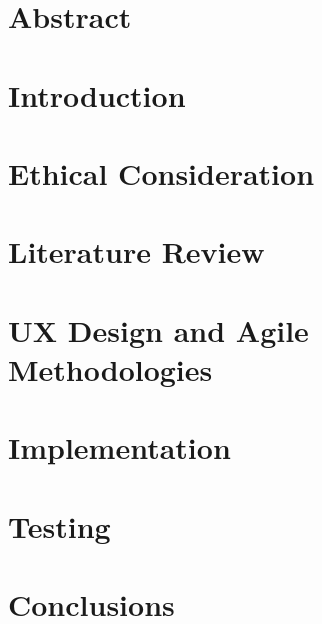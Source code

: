 \documentclass[oneside,openright,titlepage,numbers=noenddot,headinclude,footinclude=true,cleardoublepage=empty,listof=totoc,paper=a4,fontsize=11pt,english,BCOR=5mm]{scrreprt}
\begin{document}
  \frenchspacing
  \raggedbottom

  \pagestyle{plain}

  \singlespacing
  
  

  \onehalfspacing
  

  \chapter*{Abstract}
  

  

  \cleardoublepage
  \pagestyle{scrheadings}
  \onehalfspacing

  \chapter{Introduction}\label{c:Introduction}
  

  \chapter{Ethical Consideration}\label{c:Ethical-Consideration}
  

  \chapter{Literature Review}\label{c:Literature-Review}
  

  \chapter{UX Design and Agile Methodologies}\label{c:UX-Design-Agile-Methodologies}
  

  \chapter{Implementation}\label{c:Implementation}
  

  \chapter{Testing}\label{c:Testing}
  

  \chapter{Conclusions}\label{c:Conclusions}
  

  \cleardoublepage
  \appendix

  \singlespacing
  
  \cleardoublepage
\end{document}
